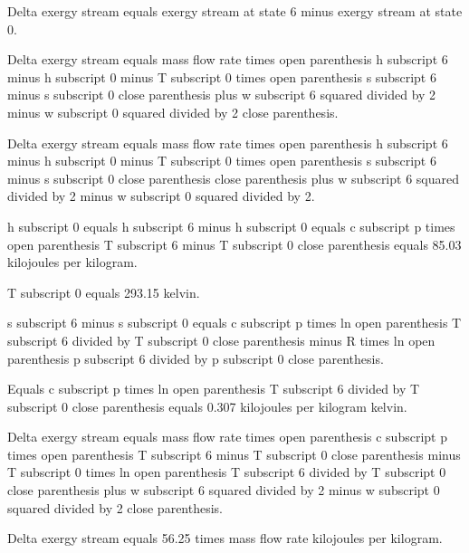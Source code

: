 Delta exergy stream equals exergy stream at state 6 minus exergy stream at state 0.  

Delta exergy stream equals mass flow rate times open parenthesis h subscript 6 minus h subscript 0 minus T subscript 0 times open parenthesis s subscript 6 minus s subscript 0 close parenthesis plus w subscript 6 squared divided by 2 minus w subscript 0 squared divided by 2 close parenthesis.  

Delta exergy stream equals mass flow rate times open parenthesis h subscript 6 minus h subscript 0 minus T subscript 0 times open parenthesis s subscript 6 minus s subscript 0 close parenthesis close parenthesis plus w subscript 6 squared divided by 2 minus w subscript 0 squared divided by 2.  

h subscript 0 equals h subscript 6 minus h subscript 0 equals c subscript p times open parenthesis T subscript 6 minus T subscript 0 close parenthesis equals 85.03 kilojoules per kilogram.  

T subscript 0 equals 293.15 kelvin.  

s subscript 6 minus s subscript 0 equals c subscript p times ln open parenthesis T subscript 6 divided by T subscript 0 close parenthesis minus R times ln open parenthesis p subscript 6 divided by p subscript 0 close parenthesis.  

Equals c subscript p times ln open parenthesis T subscript 6 divided by T subscript 0 close parenthesis equals 0.307 kilojoules per kilogram kelvin.  

Delta exergy stream equals mass flow rate times open parenthesis c subscript p times open parenthesis T subscript 6 minus T subscript 0 close parenthesis minus T subscript 0 times ln open parenthesis T subscript 6 divided by T subscript 0 close parenthesis plus w subscript 6 squared divided by 2 minus w subscript 0 squared divided by 2 close parenthesis.  

Delta exergy stream equals 56.25 times mass flow rate kilojoules per kilogram.